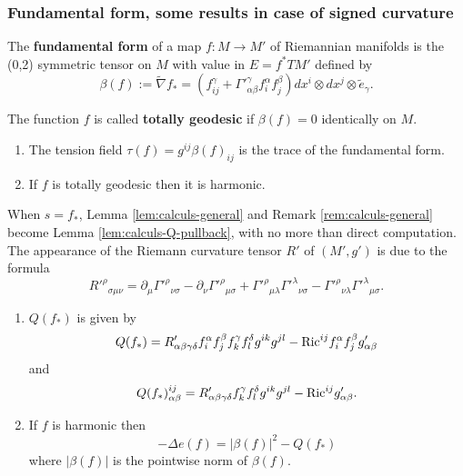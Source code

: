\subsubsection{Fundamental form, some results in case of signed curvature}
\label{sec:org88fba4e}

\begin{definition}
The \textbf{fundamental form} of a map \(f: M \longrightarrow M'\) of Riemannian manifolds is
the (0,2) symmetric tensor on \(M\) with value in \(E=f^* TM'\) defined by
\[
 \beta(f):= \tilde \nabla f_* = \left(f^\gamma_{ij} + \Gamma'^\gamma_{\alpha\beta}
f^\alpha_i f^\beta_j\right) dx^i\otimes dx^j\otimes \tilde e_\gamma.
\]

The function \(f\) is called \textbf{totally geodesic} if \(\beta(f) = 0\) identically on \(M\).
\end{definition}

\begin{remark}
\begin{enumerate}
\item The tension field \(\tau(f) = g^{ij} \beta(f)_{ij}\) is the trace of the
fundamental form.
\item If \(f\) is totally geodesic then it is harmonic.
\end{enumerate}
\end{remark}

When \(s = f_*\), Lemma \ref{lem:calculs-general} and Remark \ref{rem:calculs-general}
become Lemma \ref{lem:calculs-Q-pullback}, with no more than direct computation. The appearance of the Riemann curvature
tensor \(R'\) of \((M',g')\) is due to the formula
\[ R'^\rho{}_{\sigma\mu\nu} = \partial_\mu\Gamma'^\rho{}_{\nu\sigma} -
\partial_\nu\Gamma'^\rho{}_{\mu\sigma} +
\Gamma'^\rho{}_{\mu\lambda}\Gamma'^\lambda{}_{\nu\sigma} -
\Gamma'^\rho{}_{\nu\lambda}\Gamma'^\lambda{}_{\mu\sigma}. \]

\begin{lemma}
\label{lem:calculs-Q-pullback}
\begin{enumerate}
\item \(Q(f_*)\) is given by
\[
   Q(f_*) = R'_{\alpha\beta\gamma\delta} f^\alpha_i f^\beta_j f^\gamma_k f^\delta_l
   g^{ik}g^{jl} - {\rm Ric}^{ij}f_i^\alpha f^\beta_j g'_{\alpha\beta}
   \]
and
\[
   Q(f_*)_{\alpha\beta}^{ij} = R'_{\alpha\beta\gamma\delta}f^\gamma_k f^\delta_l g^{ik}g^{jl}
   -{\rm Ric}^{ij}g'_{\alpha\beta}.
   \]
\item If \(f\) is harmonic then 
\[
    -\Delta e(f) = |\beta(f)|^2 - Q(f_*)
   \]
 where \(|\beta(f)|\) is the pointwise norm of \(\beta(f)\).
\end{enumerate}
\end{lemma}


